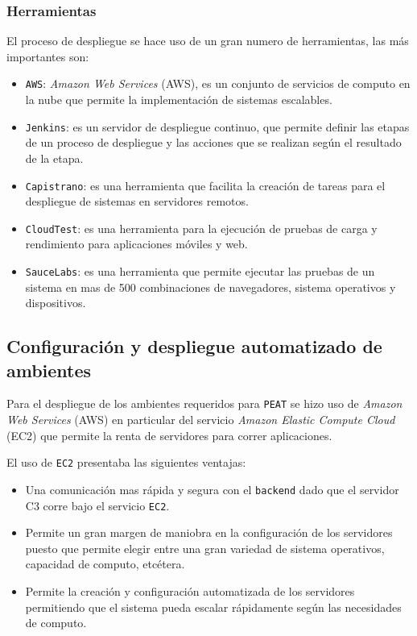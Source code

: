 \subsubsection{Herramientas}

El proceso de despliegue se hace uso de un gran numero de herramientas, las más
importantes son:

\begin{itemize}
\item \texttt{AWS}: \textit{Amazon Web Services} (AWS), es un conjunto de servicios
  de computo en la nube que permite la implementación de sistemas escalables.
\item \texttt{Jenkins}: es un servidor de despliegue continuo, que permite
  definir las etapas de un proceso de despliegue y las acciones que se realizan
  según el resultado de la etapa.
\item \texttt{Capistrano}: es una herramienta que facilita la creación de tareas
  para el despliegue de sistemas en servidores remotos.
\item \texttt{CloudTest}: es una herramienta para la ejecución de pruebas de
  carga y rendimiento para aplicaciones móviles y web.
\item \texttt{SauceLabs}: es una herramienta que permite ejecutar las pruebas de un
  sistema en mas de 500 combinaciones de navegadores, sistema operativos
  y dispositivos.
\end{itemize}

\subsection{Configuración y despliegue automatizado de ambientes}

Para el despliegue de los ambientes requeridos para \texttt{PEAT} se hizo uso de
\textit{Amazon Web Services} (AWS) en particular del servicio
\textit{Amazon Elastic Compute Cloud} (EC2) que permite la renta de servidores
para correr aplicaciones.

El uso de \texttt{EC2} presentaba las siguientes ventajas:
\begin{itemize}
\item Una comunicación mas rápida y segura con el \texttt{backend} dado que el
  servidor C3 corre bajo el servicio \texttt{EC2}.
\item Permite un gran margen de maniobra en la configuración de los servidores
  puesto que permite elegir entre una gran variedad de sistema operativos,
  capacidad de computo, etcétera.
\item Permite la creación y configuración automatizada de los servidores
  permitiendo que el sistema pueda escalar rápidamente según las necesidades
  de computo.
\end{itemize}

